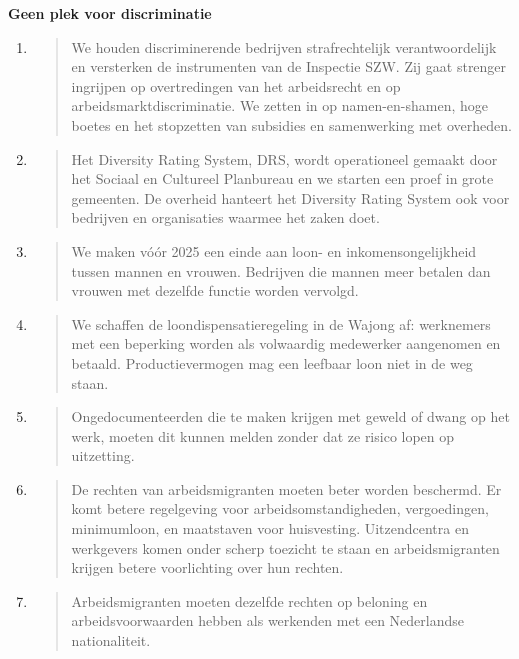 \textbf{Geen plek voor discriminatie}

\begin{enumerate}
\def\labelenumi{\arabic{enumi}.}
\item
  \begin{quote}
  We houden discriminerende bedrijven strafrechtelijk verantwoordelijk
  en versterken de instrumenten van de Inspectie SZW. Zij gaat strenger
  ingrijpen op overtredingen van het arbeidsrecht en op
  arbeidsmarktdiscriminatie. We zetten in op namen-en-shamen, hoge
  boetes en het stopzetten van subsidies en samenwerking met overheden.
  \end{quote}
\item
  \begin{quote}
  Het Diversity Rating System, DRS, wordt operationeel gemaakt door het
  Sociaal en Cultureel Planbureau en we starten een proef in grote
  gemeenten. De overheid hanteert het Diversity Rating System ook voor
  bedrijven en organisaties waarmee het zaken doet.
  \end{quote}
\item
  \begin{quote}
  We maken vóór 2025 een einde aan loon- en inkomensongelijkheid tussen
  mannen en vrouwen. Bedrijven die mannen meer betalen dan vrouwen met
  dezelfde functie worden vervolgd.
  \end{quote}
\item
  \begin{quote}
  We schaffen de loondispensatieregeling in de Wajong af: werknemers met
  een beperking worden als volwaardig medewerker aangenomen en betaald.
  Productievermogen mag een leefbaar loon niet in de weg staan.
  \end{quote}
\item
  \begin{quote}
  Ongedocumenteerden die te maken krijgen met geweld of dwang op het
  werk, moeten dit kunnen melden zonder dat ze risico lopen op
  uitzetting.
  \end{quote}
\item
  \begin{quote}
  De rechten van arbeidsmigranten moeten beter worden beschermd. Er komt
  betere regelgeving voor arbeidsomstandigheden, vergoedingen,
  minimumloon, en maatstaven voor huisvesting. Uitzendcentra en
  werkgevers komen onder scherp toezicht te staan en arbeidsmigranten
  krijgen betere voorlichting over hun rechten.
  \end{quote}
\item
  \begin{quote}
  Arbeidsmigranten moeten dezelfde rechten op beloning en
  arbeidsvoorwaarden hebben als werkenden met een Nederlandse
  nationaliteit.
  \end{quote}
\end{enumerate}

